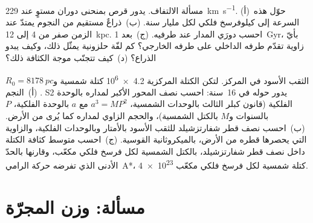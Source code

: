 \begin{exercise}[$\star\star\star$]\label{exo:b3:milky-way-galaxies:11}
مسألة الالتفاف. يدور قرص بمنحنى دوران مستوٍ عند
\qty{229}{km.s^{-1}}. (أ)~حوّل هذه السرعة إلى كيلوفرسخ فلكي لكل مليار
سنة. (ب)~ذراعٌ مستقيم من النجوم يمتدّ عند الزمن صفر من 4 إلى
\qty{12}{kpc}. احسب دورَي المدار عند طرفيه. (ج)~بعد
\qty{1}{Gyr}، بأيّ زاوية تقدّم طرفه الداخلي على طرفه
الخارجي؟ كم لفّة حلزونية يمثّل ذلك، وكيف يبدو
الذراع؟ (د)~كيف تتجنّب موجة الكثافة ذلك؟
\end{exercise}

\begin{exercise}[$\star\star\star$]\label{exo:b3:milky-way-galaxies:12}
الثقب الأسود في المركز. لتكن الكتلة المركزية
\num{4.2e6} كتلة شمسية و$R_0 = \qty{8178}{pc}$. (أ)~النجم S2
يدور حوله في \num{16}~سنة: احسب نصف المحور الأكبر لمداره بالوحدة
الفلكية (قانون كبلر الثالث بالوحدات الشمسية، $a^3 = MP^2$ مع
$a$ بالوحدة الفلكية، $P$ بالسنوات و$M$ بالكتل الشمسية)، والحجم الزاوي لمداره كما يُرى
من الأرض. (ب)~احسب نصف قطر شفارتزشيلد للثقب الأسود بالأمتار
وبالوحدات الفلكية، والزاوية التي يحصرها قطره
من الأرض، بالميكروثانية القوسية. (ج)~احسب متوسط كثافة
الكتلة داخل نصف قطر شفارتزشيلد، بالكتل الشمسية لكل
فرسخ فلكي مكعّب، وقارنها بالحدّ الأدنى الذي تفرضه حركة الرامي~A*،
\num{4e23} كتلة شمسية لكل فرسخ فلكي مكعّب.
\end{exercise}

\section{مسألة: وزن المجرّة}

